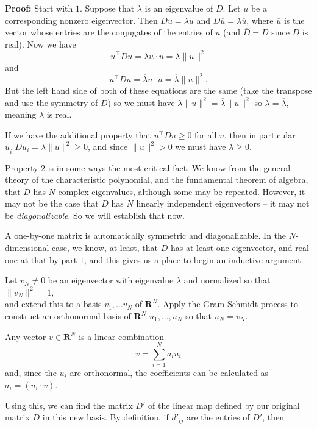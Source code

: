 \documentclass[
]{article}
\begin{document}
\textbf{Proof:} Start with \(1\). Suppose that \(\lambda\) is an
eigenvalue of \(D\). Let \(u\) be a corresponding nonzero eigenvector.
Then \(Du=\lambda u\) and
\(D\overline{u}=\overline{\lambda}\overline{u}\), where \(\overline{u}\)
is the vector whose entries are the conjugates of the entries of \(u\)
(and \(\overline{D}=D\) since \(D\) is real). Now we have \[
\overline{u}^{\intercal}Du = \lambda \overline{u}\cdot u = \lambda\|u\|^2
\] and \[
u^{\intercal}D\overline{u} = \overline{\lambda}u\cdot \overline{u} = \overline{\lambda}\|u\|^2.
\] But the left hand side of both of these equations are the same (take
the transpose and use the symmetry of \(D\)) so we must have
\(\lambda\|u\|^2 = \overline{\lambda}\|u\|^2\) so
\(\lambda=\overline{\lambda}\), meaning \(\lambda\) is real.

If we have the additional property that \(u^{\intercal}Du\ge 0\) for all
\(u\), then in particular
\(u_{i}^{\intercal}Du_{i} = \lambda\|u\|^2\ge 0\), and since
\(\|u\|^2> 0\) we must have \(\lambda\ge 0\).

Property \(2\) is in some ways the most critical fact. We know from the
general theory of the characteristic polynomial, and the fundamental
theorem of algebra, that \(D\) has \(N\) complex eigenvalues, although
some may be repeated. However, it may not be the case that \(D\) has
\(N\) linearly independent eigenvectors -- it may not be
\emph{diagonalizable}. So we will establish that now.

A one-by-one matrix is automatically symmetric and diagonalizable. In
the \(N\)-dimensional case, we know, at least, that \(D\) has at least
one eigenvector, and real one at that by part \(1\), and this gives us a
place to begin an inductive argument.

Let \(v_{N}\not=0\) be an eigenvector with eigenvalue \(\lambda\) and
normalized so that \(\|v_{N}\|^2=1\),\\
and extend this to a basis \(v_{1},\ldots v_{N}\) of \(\mathbf{R}^{N}\).
Apply the Gram-Schmidt process to construct an orthonormal basis of
\(\mathbf{R}^{N}\) \(u_{1},\ldots, u_{N}\) so that \(u_{N}=v_{N}\).

Any vector \(v\in\mathbf{R}^{N}\) is a linear combination \[
v = \sum_{i=1}^{N} a_{i}u_{i}
\] and, since the \(u_{i}\) are orthonormal, the coefficients can be
calculated as \(a_{i}=(u_{i}\cdot v)\).

Using this, we can find the matrix \(D'\) of the linear map defined by
our original matrix \(D\) in this new basis. By definition, if
\(d'_{ij}\) are the entries of \(D'\), then
\end{document}
